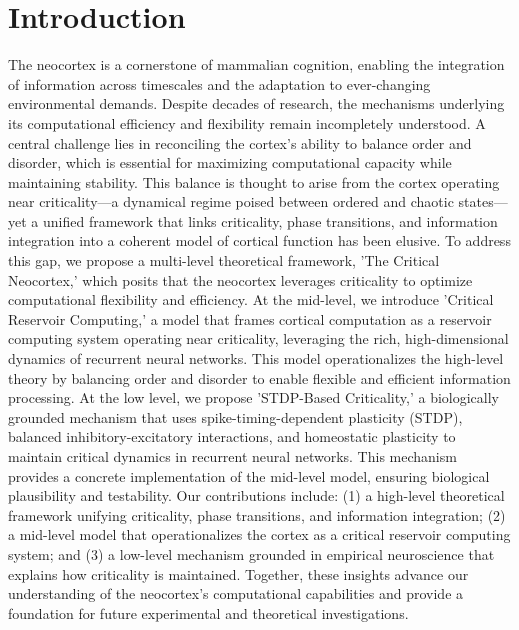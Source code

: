 \documentclass{article}
\begin{document}
\section{Introduction}
The neocortex is a cornerstone of mammalian cognition, enabling the integration of information across timescales and the adaptation to ever-changing environmental demands. Despite decades of research, the mechanisms underlying its computational efficiency and flexibility remain incompletely understood. A central challenge lies in reconciling the cortex's ability to balance order and disorder, which is essential for maximizing computational capacity while maintaining stability. This balance is thought to arise from the cortex operating near criticality—a dynamical regime poised between ordered and chaotic states—yet a unified framework that links criticality, phase transitions, and information integration into a coherent model of cortical function has been elusive. To address this gap, we propose a multi-level theoretical framework, 'The Critical Neocortex,' which posits that the neocortex leverages criticality to optimize computational flexibility and efficiency. At the mid-level, we introduce 'Critical Reservoir Computing,' a model that frames cortical computation as a reservoir computing system operating near criticality, leveraging the rich, high-dimensional dynamics of recurrent neural networks. This model operationalizes the high-level theory by balancing order and disorder to enable flexible and efficient information processing. At the low level, we propose 'STDP-Based Criticality,' a biologically grounded mechanism that uses spike-timing-dependent plasticity (STDP), balanced inhibitory-excitatory interactions, and homeostatic plasticity to maintain critical dynamics in recurrent neural networks. This mechanism provides a concrete implementation of the mid-level model, ensuring biological plausibility and testability. Our contributions include: (1) a high-level theoretical framework unifying criticality, phase transitions, and information integration; (2) a mid-level model that operationalizes the cortex as a critical reservoir computing system; and (3) a low-level mechanism grounded in empirical neuroscience that explains how criticality is maintained. Together, these insights advance our understanding of the neocortex's computational capabilities and provide a foundation for future experimental and theoretical investigations.
\end{document}
